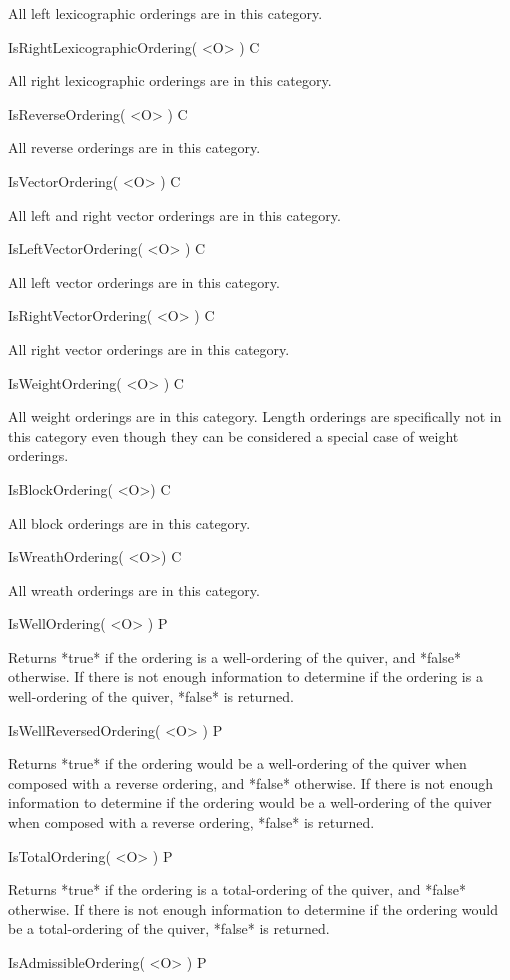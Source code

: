 All left lexicographic orderings are in this category.

\>IsRightLexicographicOrdering( <O> ) C

All right lexicographic orderings are in this category.

\>IsReverseOrdering( <O> ) C

All reverse orderings are in this category.

\>IsVectorOrdering( <O> ) C

All left and right vector orderings are in this category.

\>IsLeftVectorOrdering( <O> ) C

All left vector orderings are in this category.

\>IsRightVectorOrdering( <O> ) C

All right vector orderings are in this category.

\>IsWeightOrdering( <O> ) C

All weight orderings are in this category.  Length orderings are specifically
not in this category even though they can be considered a special case of
weight orderings.

\>IsBlockOrdering( <O>) C

All block orderings are in this category.

\>IsWreathOrdering( <O>) C

All wreath orderings are in this category.

\>IsWellOrdering( <O> ) P

Returns *true* if the ordering is a well-ordering of the quiver, and *false*
otherwise.  If there is not enough information to determine if the ordering
is a well-ordering of the quiver, *false* is returned.

\>IsWellReversedOrdering( <O> ) P

Returns *true* if the ordering would be a well-ordering of the quiver when
composed with a reverse ordering, and *false* otherwise.  If there is not
enough information to determine if the ordering would be a well-ordering of
the quiver when composed with a reverse ordering, *false* is returned.

\>IsTotalOrdering( <O> ) P

Returns *true* if the ordering is a total-ordering of the quiver, and *false*
otherwise.  If there is not enough information to determine if the ordering
would be a total-ordering of the quiver, *false* is returned.

\>IsAdmissibleOrdering( <O> ) P

